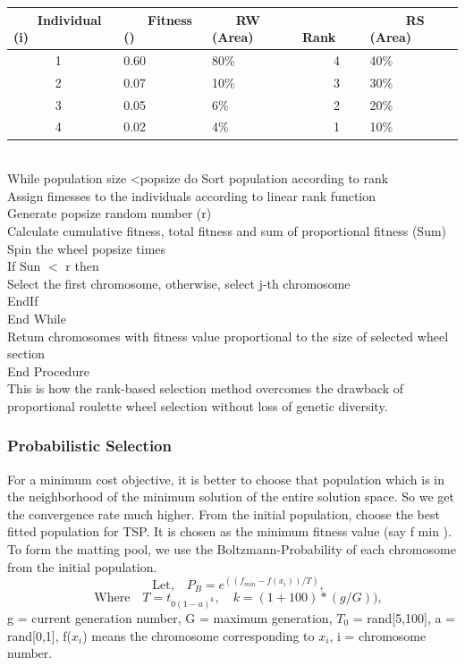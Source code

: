 \documentclass{article}
\begin{document}
\begin{center}
\begin{tabular}{|l|l|l|l|l|} 
\hline
~ ~ Individual~ (i) & ~ ~ Fitness~ () & ~ ~ RW~ (Area) & ~ ~ ~ Rank & ~ ~ ~ RS~ (Area)  \\ 
\hline
~ ~ ~ ~ 1           & 0.60            & 80\%           & ~ ~ ~ 4    & 40\%              \\ 
\hline
~ ~ ~ ~ 2           & 0.07            & 10\%           & ~ ~ ~ 3    & 30\%              \\ 
\hline
~ ~ ~ ~ 3           & 0.05            & 6\%            & ~ ~ ~ 2    & 20\%              \\ 
\hline
~ ~ ~ ~ 4           & 0.02            & 4\%            & ~ ~ ~ 1    & 10\%              \\
\hline
\end{tabular}
\end{center}
\\While population size <popsize do
Sort population according to rank\\
Assign fimesses to the individuals according to linear rank function\\
Generate popsize random number (r)\\
Calculate cumulative fitness, total fitness and sum of proportional fitness (Sum)\\
Spin the wheel popsize times\\
If Sun $<$ r then\\
Select the first chromosome, otherwise, select j-th chromosome\\
EndIf\\
End While\\
Retum chromosomes with fitness value proportional to the size of selected wheel section\\
End Procedure\\
This is how the rank-based selection method overcomes the drawback of proportional roulette wheel selection without loss of genetic diversity.
\subsubsection{Probabilistic Selection}
For a minimum cost objective, it is better to choose that population which is in the neighborhood of the minimum
solution of the entire solution space. So we get the convergence rate much higher. From the initial population,
choose the best fitted population for TSP. It is chosen as the minimum fitness value (say f min ). To form the matting
pool, we use the Boltzmann-Probability of each chromosome from the initial population.
\[
\quad \textrm{Let,}\quad
P_B=e^{((f_{min}-f(x_i))/T)},
\]
\[
\quad \textrm{Where}\quad
T=t_{0(1-a)^k}, \quad k=(1+100)*(g/G)), 
\]
 g = current generation number, G = maximum generation, $T_0$ = rand[5,100],
a = rand[0,1], f($x_i$) means the chromosome corresponding to $x_i$, i = chromosome number.
\end{document}
